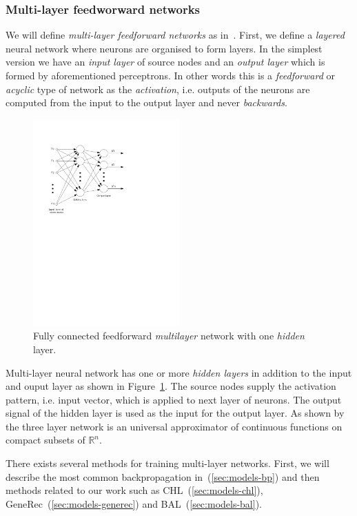\subsubsection{Multi-layer feedworward networks} 
\label{sec:theory-multilayer} 

We will define \emph{multi-layer feedforward networks} as in~\citet{haykin1994neural}. First, we define a \emph{layered} neural network where neurons are organised to form layers. In the simplest version we have an \emph{input layer} of source nodes and an \emph{output layer} which is formed by aforementioned perceptrons. In other words this is a \emph{feedforward} or \emph{acyclic} type of network as the \emph{activation}, i.e. outputs of the neurons are computed from the input to the output layer and never \emph{backwards}. 

\begin{figure}[H]
  \centering
  \includegraphics[width=0.5\textwidth]{img/multilayer.pdf}    
  \caption{Fully connected feedforward \emph{multilayer} network with one \emph{hidden} layer. } 
  \label{fig:multilayer}
\end{figure}

Multi-layer neural network has one or more \emph{hidden layers} in addition to the input and ouput layer as shown in Figure~\ref{fig:multilayer}. The source nodes supply the activation pattern, i.e. input vector, which is applied to next layer of neurons. The output signal of the hidden layer is used as the input for the output layer. As shown by~\citet{cybenko1989approximation} the three layer network is an universal approximator of continuous functions on compact subsets of $\mathbb{R}^n$.

There exists several methods for training multi-layer networks. First, we will describe the most common backpropagation in~(\ref{sec:models-bp}) and then methods related to our work such as CHL~(\ref{sec:models-chl}), GeneRec~(\ref{sec:models-generec}) and BAL~(\ref{sec:models-bal}). 
